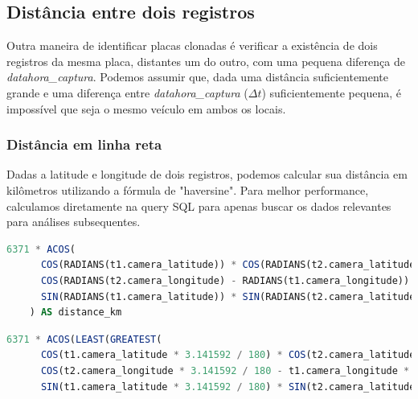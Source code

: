 \documentclass{article}
\begin{document}

\subsection{Distância entre dois registros}

Outra maneira de identificar placas clonadas é verificar a existência de dois registros da mesma placa, distantes um do outro, com uma pequena diferença de \textit{datahora\_captura}. Podemos assumir que, dada uma distância suficientemente grande e uma diferença entre \textit{datahora\_captura} ($\Delta t$) suficientemente pequena, é impossível que seja o mesmo veículo em ambos os locais.

\subsubsection{Distância em linha reta}

Dadas a latitude e longitude de dois registros, podemos calcular sua distância em kilômetros utilizando a fórmula de "haversine". Para melhor performance, calculamos diretamente na query SQL para apenas buscar os dados relevantes para análises subsequentes.

\begin{lstlisting}[language=SQL,caption={Fórmula de haversine para calcular distâncias em kilometros na superfície da Terra, através de latitudes e longitudes.},label={lst:sqlquery6}]
 6371 * ACOS(
      COS(RADIANS(t1.camera_latitude)) * COS(RADIANS(t2.camera_latitude)) *
      COS(RADIANS(t2.camera_longitude) - RADIANS(t1.camera_longitude)) +
      SIN(RADIANS(t1.camera_latitude)) * SIN(RADIANS(t2.camera_latitude))
    ) AS distance_km
\end{lstlisting}

\begin{lstlisting}[language=SQL,caption={Fórmula de haversine para calcular distâncias em kilometros na superfície da Terra, através de latitudes e longitudes. Sem acesso à função RADIANS() nem PI() e resolvendo erro de float point precision na função ACOS().},label={lst:sqlquery7}]
6371 * ACOS(LEAST(GREATEST(
      COS(t1.camera_latitude * 3.141592 / 180) * COS(t2.camera_latitude * 3.141592 / 180) * 
      COS(t2.camera_longitude * 3.141592 / 180 - t1.camera_longitude * 3.141592 / 180) + 
      SIN(t1.camera_latitude * 3.141592 / 180) * SIN(t2.camera_latitude * 3.141592 / 180),-1),1)) AS distance_km
\end{lstlisting}
\end{document}
